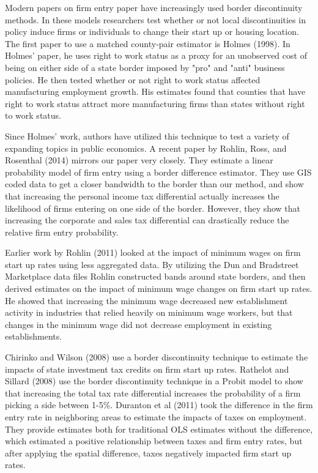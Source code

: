 Modern papers on firm entry paper have increasingly used border discontinuity methods. In these models researchers test whether or not local discontinuities in policy induce firms or individuals to change their start up or housing location. The first paper to use a matched county-pair estimator is Holmes (1998). In Holmes' paper, he uses right to work status as a proxy for an unobserved cost of being on either side of a state border imposed by "pro" and "anti" business policies. He then tested whether or not right to work status affected manufacturing employment growth. His estimates found that counties that have right to work status attract more manufacturing firms than states without right to work status.

Since Holmes' work, authors have utilized this technique to test a variety of expanding topics in public economics. A recent paper by Rohlin, Ross, and Rosenthal (2014) mirrors our paper very closely. They estimate a linear probability model of firm entry using a border difference estimator. They use GIS coded data to get a closer bandwidth to the border than our method, and show that increasing the personal income tax differential actually increases the likelihood of firms entering on one side of the border. However, they show that increasing the corporate and sales tax differential can drastically reduce the relative firm entry probability.

Earlier work by Rohlin (2011) looked at the impact of minimum wages on firm start up rates using less aggregated data. By utilizing the Dun and Bradstreet Marketplace data files Rohlin constructed bands around state borders, and then derived estimates on the impact of minimum wage changes on firm start up rates. He showed that increasing the minimum wage decreased new establishment activity in industries that relied heavily on minimum wage workers, but that changes in the minimum wage did not decrease employment in existing establishments.

Chirinko and Wilson (2008) use a border discontinuity technique to estimate the impacts of state investment tax credits on firm start up rates. Rathelot and Sillard (2008) use the border discontinuity technique in a Probit model to show that increasing the total tax rate differential increases the probability of a firm picking a side between 1-5\%. Duranton et al (2011) took the difference in the firm entry rate in neighboring areas to estimate the impacts of taxes on employment. They provide estimates both for traditional OLS estimates without the difference, which estimated a positive relationship between taxes and firm entry rates, but after applying the spatial difference, taxes negatively impacted firm start up rates.

